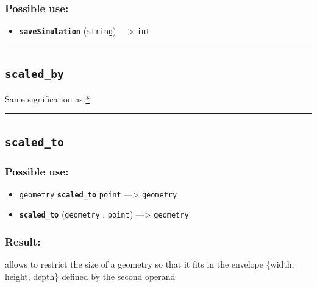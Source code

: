 \documentclass[]{book}
\providecommand{\tightlist}{%
  \setlength{\itemsep}{0pt}\setlength{\parskip}{0pt}}
\theoremstyle{definition}
\theoremstyle{definition}
\theoremstyle{definition}
\theoremstyle{remark}
\begin{document}
\subsubsection{Possible use:}\label{possible-use-450}

\begin{itemize}
\tightlist
\item
  \textbf{\texttt{saveSimulation}} (\texttt{string}) ---\textgreater{}
  \texttt{int}
\end{itemize}

\begin{center}\rule{0.5\linewidth}{\linethickness}\end{center}

\subsection{\texorpdfstring{\texttt{scaled\_by}}{scaled\_by}}\label{scaled_by}

Same signification as \href{operators-a-to-a.html\#*}{*}

\begin{center}\rule{0.5\linewidth}{\linethickness}\end{center}

\subsection{\texorpdfstring{\texttt{scaled\_to}}{scaled\_to}}\label{scaled_to}

\subsubsection{Possible use:}\label{possible-use-451}

\begin{itemize}
\tightlist
\item
  \texttt{geometry} \textbf{\texttt{scaled\_to}} \texttt{point}
  ---\textgreater{} \texttt{geometry}
\item
  \textbf{\texttt{scaled\_to}} (\texttt{geometry} , \texttt{point})
  ---\textgreater{} \texttt{geometry}
\end{itemize}

\subsubsection{Result:}\label{result-436}

allows to restrict the size of a geometry so that it fits in the
envelope \{width, height, depth\} defined by the second operand
\end{document}
